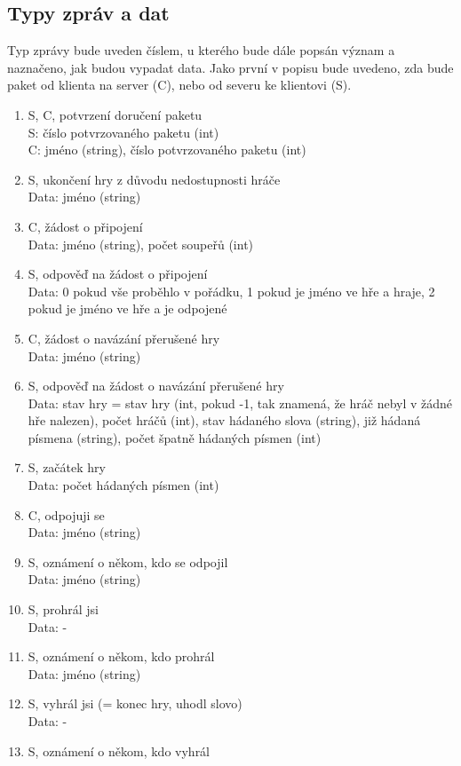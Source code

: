 \documentclass[12pt, a4paper]{article}
\begin{document}
	\subsection{Typy zpráv a dat}
	Typ zprávy bude uveden číslem, u kterého bude dále popsán význam a naznačeno, jak budou vypadat data. Jako první v popisu bude uvedeno, zda bude paket od klienta na server (C), nebo od severu ke klientovi (S).
		\begin{enumerate}
		\item S, C, potvrzení doručení paketu\\
		S: číslo potvrzovaného paketu (int)\\
		C: jméno (string), číslo potvrzovaného paketu (int)
		\item S, ukončení hry z důvodu nedostupnosti hráče\\
		Data: jméno (string)
		\item C, žádost o připojení\\
		Data: jméno (string), počet soupeřů (int)
		\item S, odpověď na žádost o připojení\\
		Data:	0 pokud vše proběhlo v pořádku, 1 pokud je jméno ve hře a hraje, 2 pokud je jméno ve hře a je odpojené
		\item C, žádost o navázání přerušené hry\\
		Data: jméno (string)
		\item S, odpověď na žádost o navázání přerušené hry\\
		Data: stav hry = stav hry (int, pokud -1, tak znamená, že hráč nebyl v žádné hře nalezen), počet hráčů (int), stav hádaného slova (string), již hádaná písmena (string), počet špatně hádaných písmen (int)
		\item S, začátek hry\\
		Data: počet hádaných písmen (int)
		\item C, odpojuji se\\
		Data: jméno (string)
		\item S, oznámení o někom, kdo se odpojil\\
		Data: jméno (string)
		\item S, prohrál jsi\\
		Data: -
		\item S, oznámení o někom, kdo prohrál\\
		Data: jméno (string)
		\item S, vyhrál jsi (= konec hry, uhodl slovo)\\
		Data: -
		\item S, oznámení o někom, kdo vyhrál\\

\end{enumerate}
\end{document}
